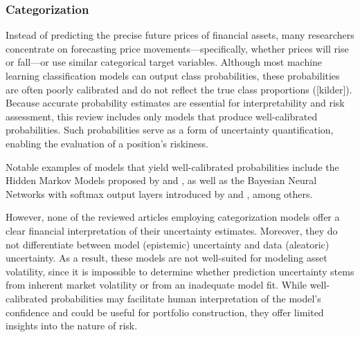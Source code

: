 \subsubsection{Categorization}
Instead of predicting the precise future prices of financial assets, many researchers concentrate on forecasting price movements—specifically, whether prices will rise or fall—or use similar categorical target variables. Although most machine learning classification models can output class probabilities, these probabilities are often poorly calibrated and do not reflect the true class proportions ([kilder]). Because accurate probability estimates are essential for interpretability and risk assessment, this review includes only models that produce well-calibrated probabilities. Such probabilities serve as a form of uncertainty quantification, enabling the evaluation of a position's riskiness.

Notable examples of models that yield well-calibrated probabilities include the Hidden Markov Models proposed by \textcite{...} and \textcite{...}, as well as the Bayesian Neural Networks with softmax output layers introduced by \textcite{...} and \textcite{...}, among others. \textcite{magris2023bayesian}

However, none of the reviewed articles employing categorization models offer a clear financial interpretation of their uncertainty estimates. Moreover, they do not differentiate between model (epistemic) uncertainty and data (aleatoric) uncertainty. As a result, these models are not well-suited for modeling asset volatility, since it is impossible to determine whether prediction uncertainty stems from inherent market volatility or from an inadequate model fit. While well-calibrated probabilities may facilitate human interpretation of the model's confidence and could be useful for portfolio construction, they offer limited insights into the nature of risk.


